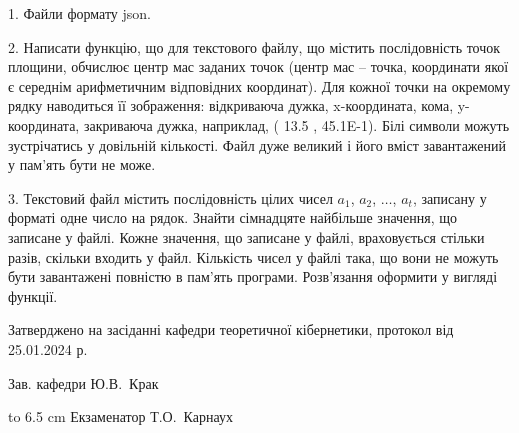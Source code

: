 \documentclass[12pt, ukrainian]{article}
\begin{document}
{%
1. Файли формату json.%
\par
2. Написати функцію, що для текстового файлу, що містить послідовність точок площини, обчислює центр мас заданих точок (центр мас -- точка, координати якої є середнім арифметичним відповідних координат). Для кожної точки на окремому рядку наводиться її зображення: відкриваюча дужка, x-координата, кома, y-координата, закриваюча дужка, наприклад, ( 13.5 , 45.1E-1). Білі символи можуть зустрічатись у довільній кількості. Файл дуже великий і його вміст завантажений у пам'ять бути не може.

\par
3. Текстовий файл містить послідовність цілих чисел $a_1$, $a_2$, $\ldots$, $a_t$, записану у форматі одне число на рядок. Знайти сімнадцяте найбільше значення, що записане у файлі. Кожне значення, що записане у файлі, враховується стільки разів, скільки входить у файл. Кількість чисел у файлі така, що вони не можуть бути завантажені повністю в пам'ять програми. Розв'язання оформити у вигляді функції.

}
{\smallskip\smallskip \begin {scriptsize} Затверджено на засіданні кафедри теоретичної кібернетики, протокол   від   25.01.2024 р.\par\smallskip\smallskip\smallskip\smallskip
{\parbox {6.5 cm} {Зав. кафедри \dotfill Ю.В.~Крак}}\hspace {0.7cm} {\hbox to 6.5 cm { Екзаменатор \dotfill Т.О.~Карнаух}} \end{scriptsize}}
\newpage
\end{document}
